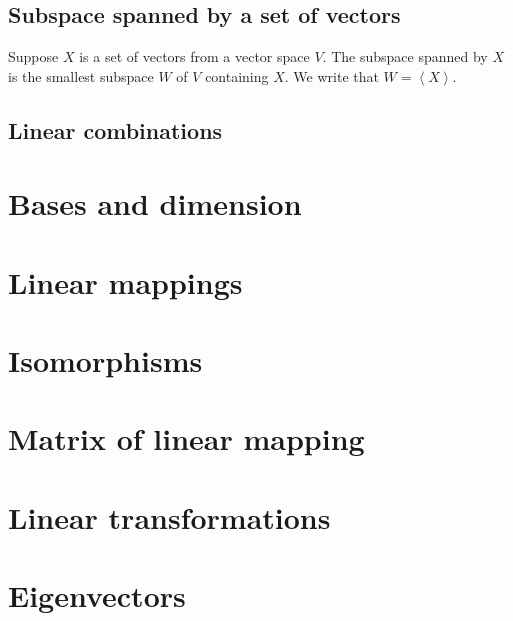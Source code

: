 \documentclass[12pt]{article}
\begin{document}
	\subsection{Subspace spanned by a set of vectors}
	\begin{thm}
		Suppose $X$ is a set of vectors from a vector space $V$. The subspace spanned by $X$ is the smallest subspace $W$ of $V$ containing $X$. We write that $W = \left< X \right>$.
	\end{thm}
	
	\subsection{Linear combinations}
	\begin{defn}
		
	\end{defn}

\section{Bases and dimension}
\section{Linear mappings}
\section{Isomorphisms}
\section{Matrix of linear mapping}
\section{Linear transformations}
\section{Eigenvectors}
\end{document}
